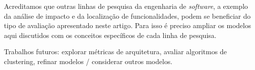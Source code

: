 \documentclass{acm_proc_article-sp}
\begin{document}
Acreditamos que outras linhas de pesquisa da engenharia de \emph{software}, a exemplo da análise de impacto e da localização de funcionalidades, podem se beneficiar do tipo de avaliação apresentado neste artigo. Para isso é preciso ampliar os modelos aqui discutidos com os conceitos específicos de cada linha de pesquisa.

Trabalhos futuros: explorar métricas de arquitetura, avaliar algoritmos de clustering, refinar modelos / considerar outros modelos.


%


\end{document}
